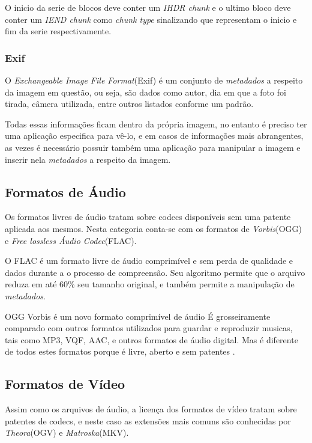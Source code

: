 O inicio da serie de blocos deve conter um \textit{IHDR chunk} e o ultimo bloco deve conter um \textit{IEND chunk} como \textit{chunk type} sinalizando que representam o inicio e fim da serie respectivamente.

\subsubsection{Exif}

O \textit{Exchangeable Image File Format}(Exif) é um conjunto de \textit{metadados} a respeito da imagem em questão, ou seja, são dados como autor, dia em que a foto foi tirada, câmera utilizada, entre outros listados conforme um padrão.

Todas essas informações ficam dentro da própria imagem, no entanto é preciso ter uma aplicação especifica para vê-lo, e em casos de informações mais abrangentes, as vezes é necessário possuir também uma aplicação para manipular a imagem e inserir nela \textit{metadados} a respeito da imagem.

\subsection{Formatos de Áudio}

Os formatos livres de áudio tratam sobre codecs disponíveis sem uma patente aplicada aos mesmos. Nesta categoria conta-se com os formatos de \textit{Vorbis}(OGG) e \textit{Free lossless Áudio Codec}(FLAC).

O FLAC é um formato livre de áudio comprimível e sem perda de qualidade e dados durante a o processo de compreensão. Seu algoritmo permite que o arquivo reduza em até 60\% seu tamanho original, e também permite a manipulação de \textit{metadados}.

OGG Vorbis é um novo formato comprimível de áudio É grosseiramente comparado com outros formatos utilizados para guardar e reproduzir musicas, tais como MP3, VQF, AAC, e outros formatos de áudio digital. Mas é diferente de todos estes formatos porque é livre, aberto e sem patentes \cite{XIPH}.

\subsection{Formatos de Vídeo}

Assim como os arquivos de áudio, a licença dos formatos de vídeo tratam sobre patentes de codecs, e neste caso as extensões mais comuns são conhecidas por \textit{Theora}(OGV) e \textit{Matroska}(MKV).

